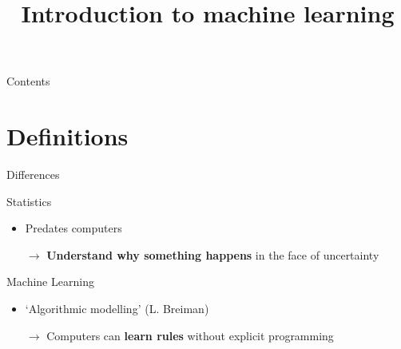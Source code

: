 

\title{Introduction to machine learning}

\newcommand{\E}[1]{\ensuremath{\mathbb{E}\!\left[ #1 \right]}}
\newcommand{\V}[1]{\ensuremath{\mathbb{V}\!\left[ #1 \right]}}



\maketitle

\begin{frame}{Contents}
    \tableofcontents[hideallsubsections]
\end{frame}

\section{Definitions}

\begin{frame}{Differences}
    \begin{block}{Statistics}
        \begin{itemize}
            \item Predates computers
            \item[$\rightarrow$] \textbf{Understand why something happens} in
                                 the face of uncertainty
        \end{itemize}
    \end{block}
    \vfill\pause
    \begin{block}{Machine Learning}
        \begin{itemize}
            \item `Algorithmic modelling' (L. Breiman)
            \item[$\rightarrow$] Computers can \textbf{learn rules} without
                                 explicit programming
        \end{itemize}
    \end{block}
\end{frame}

